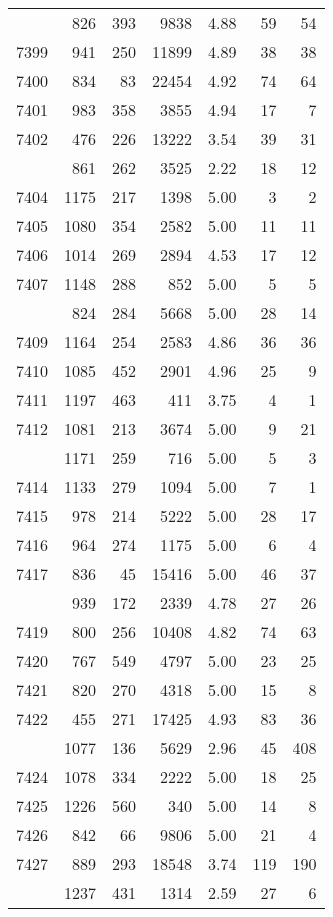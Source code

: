 \documentclass[
]{article}
\begin{document}
\begin{table}
\begin{tabular}[t]{lrrrrrr}
\addlinespace
7398 & 826 & 393 & 9838 & 4.88 & 59 & 54\\
7399 & 941 & 250 & 11899 & 4.89 & 38 & 38\\
7400 & 834 & 83 & 22454 & 4.92 & 74 & 64\\
7401 & 983 & 358 & 3855 & 4.94 & 17 & 7\\
7402 & 476 & 226 & 13222 & 3.54 & 39 & 31\\
\addlinespace
7403 & 861 & 262 & 3525 & 2.22 & 18 & 12\\
7404 & 1175 & 217 & 1398 & 5.00 & 3 & 2\\
7405 & 1080 & 354 & 2582 & 5.00 & 11 & 11\\
7406 & 1014 & 269 & 2894 & 4.53 & 17 & 12\\
7407 & 1148 & 288 & 852 & 5.00 & 5 & 5\\
\addlinespace
7408 & 824 & 284 & 5668 & 5.00 & 28 & 14\\
7409 & 1164 & 254 & 2583 & 4.86 & 36 & 36\\
7410 & 1085 & 452 & 2901 & 4.96 & 25 & 9\\
7411 & 1197 & 463 & 411 & 3.75 & 4 & 1\\
7412 & 1081 & 213 & 3674 & 5.00 & 9 & 21\\
\addlinespace
7413 & 1171 & 259 & 716 & 5.00 & 5 & 3\\
7414 & 1133 & 279 & 1094 & 5.00 & 7 & 1\\
7415 & 978 & 214 & 5222 & 5.00 & 28 & 17\\
7416 & 964 & 274 & 1175 & 5.00 & 6 & 4\\
7417 & 836 & 45 & 15416 & 5.00 & 46 & 37\\
\addlinespace
7418 & 939 & 172 & 2339 & 4.78 & 27 & 26\\
7419 & 800 & 256 & 10408 & 4.82 & 74 & 63\\
7420 & 767 & 549 & 4797 & 5.00 & 23 & 25\\
7421 & 820 & 270 & 4318 & 5.00 & 15 & 8\\
7422 & 455 & 271 & 17425 & 4.93 & 83 & 36\\
\addlinespace
7423 & 1077 & 136 & 5629 & 2.96 & 45 & 408\\
7424 & 1078 & 334 & 2222 & 5.00 & 18 & 25\\
7425 & 1226 & 560 & 340 & 5.00 & 14 & 8\\
7426 & 842 & 66 & 9806 & 5.00 & 21 & 4\\
7427 & 889 & 293 & 18548 & 3.74 & 119 & 190\\
\addlinespace
7428 & 1237 & 431 & 1314 & 2.59 & 27 & 6\\

\end{tabular}
\end{table}
\end{document}
